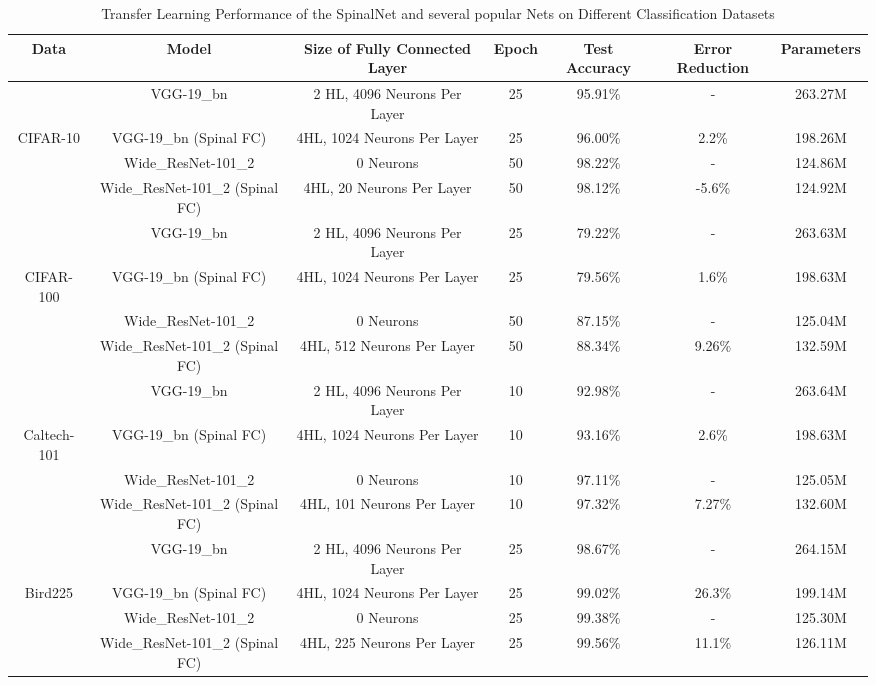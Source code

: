 \documentclass[journal]{IEEEtran}
\begin{document}
\begin{table*}
\centering
\caption{Transfer Learning Performance of the SpinalNet and several popular Nets on Different Classification Datasets}
\label{Perf_TL}
\begin{tabular}{|c|c|c|c|c|c|c|}
\hline
 Data  & Model & Size of Fully Connected Layer & Epoch & Test Accuracy & Error Reduction & Parameters  \\ \hline 
 
   & VGG-19\_bn & 2 HL, 4096 Neurons Per Layer & 25 & 95.91\%  & - &263.27M\\  \cline{2-7}
  CIFAR-10    & VGG-19\_bn (Spinal FC) &  4HL, 1024 Neurons Per Layer & 25 & 96.00\%  & 2.2\% &198.26M\\  \cline{2-7}
 \cite{krizhevsky2009learning} & Wide\_ResNet-101\_2 & 0 Neurons & 50 & 98.22\%  & - &124.86M\\  \cline{2-7}
 & Wide\_ResNet-101\_2 (Spinal FC) & 4HL, 20 Neurons Per Layer &50 &98.12\% & -5.6\% &124.92M\\ \hline  \hline

   & VGG-19\_bn & 2 HL, 4096 Neurons Per Layer & 25 & 79.22\%  & - &263.63M\\  \cline{2-7}
 CIFAR-100     & VGG-19\_bn (Spinal FC) &  4HL, 1024 Neurons Per Layer & 25 & 79.56\%  & 1.6\% &198.63M\\  \cline{2-7}
  \cite{krizhevsky2009learning} & Wide\_ResNet-101\_2 & 0 Neurons & 50 & 87.15\%  & - &125.04M\\  \cline{2-7}
 & Wide\_ResNet-101\_2 (Spinal FC) &  4HL, 512 Neurons Per Layer &50 &88.34\% & 9.26\% &132.59M\\ \hline \hline

   & VGG-19\_bn & 2 HL, 4096 Neurons Per Layer & 10 & 92.98\%  & - &263.64M\\  \cline{2-7}
  Caltech-101     & VGG-19\_bn (Spinal FC) &  4HL, 1024 Neurons Per Layer & 10 & 93.16\%  & 2.6\% &198.63M\\  \cline{2-7}
 \cite{li2004caltech} & Wide\_ResNet-101\_2 & 0 Neurons & 10 & 97.11\%  & - &125.05M\\  \cline{2-7}
 & Wide\_ResNet-101\_2 (Spinal FC) & 4HL, 101 Neurons Per Layer &10 &97.32\% & 7.27\% &132.60M\\ \hline \hline

  & VGG-19\_bn & 2 HL, 4096 Neurons Per Layer & 25 & 98.67\%  & - &264.15M\\  \cline{2-7}
 Bird225 & VGG-19\_bn (Spinal FC) & 4HL, 1024 Neurons Per Layer &25 &99.02\% & 26.3\% &199.14M\\ \cline{2-7}
 \cite{bird225} & Wide\_ResNet-101\_2 & 0 Neurons & 25 & 99.38\%  & - &125.30M\\  \cline{2-7} 
 & Wide\_ResNet-101\_2 (Spinal FC) & 4HL, 225 Neurons Per Layer &25 &99.56\% & 11.1\% &126.11M\\ \hline \hline


\end{tabular}
\end{table*}
\end{document}
